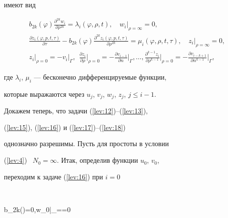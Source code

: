 имеют вид


\begin{gather}\label{lev:16}


b_{2k}(\varphi)\frac{\partial^{2k}w_i}{\partial \rho^{2k}}=


\lambda_i(\varphi,\rho,t),\quad


w_i\big|_{\rho=\infty}=0,\\


%


\label{lev:17}


\frac{\partial z_i(\varphi,p,t,\tau)}{\partial \tau}-b_{2k}(\varphi)


\frac{\partial^{2k} z_i(\varphi,p,t,\tau)}{\partial


\rho^{2k}}=\mu_i(\varphi,\rho,t,\tau),\quad


z_i\big|_{\rho=\infty}=0,\\


%


\label{lev:18}


z_i\big|_{\rho=0}=-v_i\big|_\Gamma,\ \


\frac{\partial z_i}{\partial \rho}\Big|_{\rho=0}=


-\frac{\partial v_{i-1}}{\partial


n}\Big|_\Gamma, \dotsc ,


\frac{\partial^{k-1} z_i}{\partial \rho^{k-1}}\Big|_{\rho=0}=


-\frac{\partial v_{i-k+1}}{\partial


n^{k-1}}\Big|_\Gamma,


\end{gather}


где $\lambda_i$, $\mu_i$ --- бесконечно дифференцируемые функции,


которые выражаются через $u_j$, $v_j$, $w_j$, $z_j$, $j\leqslant


i-1$.





Докажем теперь, что задачи (\ref{lev:12})--(\ref{lev:13}),


(\ref{lev:15}), (\ref{lev:16}) и (\ref{lev:17})--(\ref{lev:18})


однозначно разрешимы. Пусть для простоты в условии


(\ref{lev:4}) \ $N_0=\infty$. Итак, определив функции $u_0$, $v_0$, 


переходим к задаче (\ref{lev:16}) при $i=0$


$$


b_{2k}(\varphi)=0,\quad   w_0\big|_{\rho=\infty}=0


